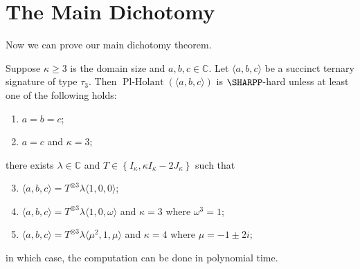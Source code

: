 \documentclass[11pt]{article}
\newcommand{\PlHolant}{\operatorname{Pl-Holant}}
\begin{document}
\section{The Main Dichotomy} \label{sec:dichotomy}

Now we can prove our main dichotomy theorem.

\begin{theorem} \label{thm:dichotomy}
 Suppose $\kappa \ge 3$ is the domain size and $a,b,c \in \mathbb{C}$.
 Let $\langle a,b,c \rangle$ be a succinct ternary signature of type $\tau_3$.
 Then $\PlHolant(\langle a,b,c \rangle)$ is $\SHARPP$-hard
 unless at least one of the following holds:
 \begin{enumerate}
  \item $a = b = c$; \label{case:thm:dichotomy:degenerate}
  \item $a = c$ and $\kappa = 3$; \label{case:thm:dichotomy:k=3_aba}
 \end{enumerate}
 there exists $\lambda \in \mathbb{C}$ and $T \in \left\{I_\kappa, \kappa I_\kappa - 2 J_\kappa\right\}$ such that
 \begin{enumerate}
  \setcounter{enumi}{2} %
  \item $\langle a,b,c \rangle = T^{\otimes 3} \lambda \langle 1,0,0 \rangle$; \label{case:thm:dichotomy:100}
  \item $\langle a,b,c \rangle = T^{\otimes 3} \lambda \langle 1,0,\omega  \rangle$ and $\kappa = 3$ where $\omega^3 = 1$; \label{case:thm:dichotomy:k=3_10w}
  \item $\langle a,b,c \rangle = T^{\otimes 3} \lambda \langle \mu^2,1,\mu \rangle$ and $\kappa = 4$ where $\mu = -1 \pm 2 i$; \label{case:thm:dichotomy:k=4_u^21u}
 \end{enumerate}
 in which case, the computation can be done in polynomial time.
\end{theorem}
\end{document}
